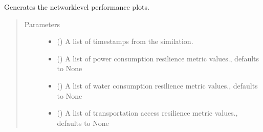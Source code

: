 \documentclass[letterpaper,10pt,english]{sphinxmanual}
\begin{document}

\begin{fulllineitems}
\label{\detokenize{apidoc:dreaminsg_integrated_model.src.plots.plot_interdependent_effects}}
\sphinxAtStartPar
Generates the network\sphinxhyphen{}level performance plots.
\begin{quote}\begin{description}
\item[{Parameters}] \leavevmode\begin{itemize}
\item {} 
\sphinxAtStartPar
{} () \textendash{} A list of time\sphinxhyphen{}stamps from the similation.

\item {} 
\sphinxAtStartPar
{} (\sphinxstyleliteralemphasis{\sphinxupquote{, }}) \textendash{} A list of power consumption resilience metric values., defaults to None

\item {} 
\sphinxAtStartPar
{} (\sphinxstyleliteralemphasis{\sphinxupquote{, }}) \textendash{} A list of water consumption resilience metric values., defaults to None

\item {} 
\sphinxAtStartPar
{} (\sphinxstyleliteralemphasis{\sphinxupquote{, }}) \textendash{} A list of transportation access resilience metric values., defaults to None


\end{itemize}
\end{description}
\end{quote}
\end{fulllineitems}
\end{document}
